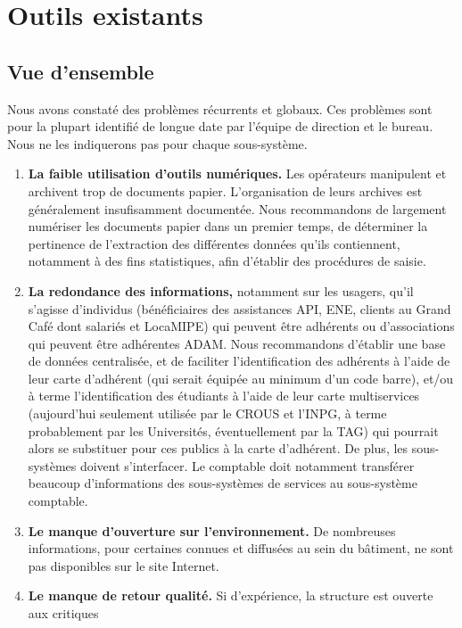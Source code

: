 \section{Outils existants}
\subsection{Vue d'ensemble}
\label{general}

Nous avons constaté des problèmes récurrents et globaux. Ces problèmes sont pour
la plupart identifié de longue date par l'équipe de direction et le bureau. Nous
ne les indiquerons pas pour chaque sous-système.

\begin{enumerate}
\item \textbf{La faible utilisation d'outils numériques.} Les opérateurs manipulent et archivent
      trop de documents papier.
      L'organisation de leurs archives est généralement insufisamment documentée.
      Nous recommandons de largement numériser les documents papier dans un premier temps,
      de déterminer la pertinence de l'extraction des différentes données qu'ils contiennent,
      notamment à des fins statistiques, afin d'établir des procédures de saisie.
\item \textbf{La redondance des informations,} notamment sur les usagers, qu'il s'agisse d'individus
      (bénéficiaires des assistances API, ENE, clients au Grand Café dont salariés et LocaMIPE)
      qui peuvent être adhérents ou d'associations qui peuvent être adhérentes ADAM.
      Nous recommandons d'établir une base de données centralisée, et de faciliter l'identification
      des adhérents à l'aide de leur carte d'adhérent (qui serait équipée au minimum d'un code barre),
      et/ou à terme l'identification des étudiants à l'aide de leur carte multiservices
      (aujourd'hui seulement utilisée par le CROUS et l'INPG, à terme probablement
      par les Universités, éventuellement par la TAG) qui pourrait alors se substituer
      pour ces publics à la carte d'adhérent.
      De plus, les sous-systèmes doivent s'interfacer. Le comptable doit notamment transférer
      beaucoup d'informations des sous-systèmes de services au sous-système comptable.
\item \textbf{Le manque d'ouverture sur l'environnement.} De nombreuses informations, pour certaines
      connues et diffusées au sein du bâtiment, ne sont pas disponibles sur le site Internet.
\item \textbf{Le manque de retour qualité.} Si d'expérience, la structure est ouverte aux critiques

\end{enumerate}
